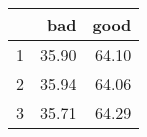 \begin{table}[ht]
\centering
\begin{tabular}{rrr}
  \hline
 & bad & good \\ 
  \hline
1 & 35.90 & 64.10 \\ 
  2 & 35.94 & 64.06 \\ 
  3 & 35.71 & 64.29 \\ 
   \hline
\end{tabular}
\end{table}
